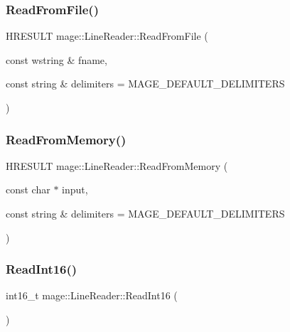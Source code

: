\subsubsection{\texorpdfstring{Read\+From\+File()}{ReadFromFile()}}
{\footnotesize\ttfamily H\+R\+E\+S\+U\+LT mage\+::\+Line\+Reader\+::\+Read\+From\+File (\begin{DoxyParamCaption}\item[{const wstring \&}]{fname,  }\item[{const string \&}]{delimiters = {\ttfamily MAGE\+\_\+DEFAULT\+\_\+DELIMITERS} }\end{DoxyParamCaption})}

\hypertarget{classmage_1_1_line_reader_a340d9f9a0d148b3a4dbe7ba300cfaca4}{}\label{classmage_1_1_line_reader_a340d9f9a0d148b3a4dbe7ba300cfaca4} 
\subsubsection{\texorpdfstring{Read\+From\+Memory()}{ReadFromMemory()}}
{\footnotesize\ttfamily H\+R\+E\+S\+U\+LT mage\+::\+Line\+Reader\+::\+Read\+From\+Memory (\begin{DoxyParamCaption}\item[{const char $\ast$}]{input,  }\item[{const string \&}]{delimiters = {\ttfamily MAGE\+\_\+DEFAULT\+\_\+DELIMITERS} }\end{DoxyParamCaption})}

\hypertarget{classmage_1_1_line_reader_a5ec3ccfcd1044f6be73c51082d2b57e3}{}\label{classmage_1_1_line_reader_a5ec3ccfcd1044f6be73c51082d2b57e3} 
\subsubsection{\texorpdfstring{Read\+Int16()}{ReadInt16()}}
{\footnotesize\ttfamily int16\+\_\+t mage\+::\+Line\+Reader\+::\+Read\+Int16 (\begin{DoxyParamCaption}{ }\end{DoxyParamCaption})\hspace{0.3cm}{\ttfamily [protected]}}

\hypertarget{classmage_1_1_line_reader_a45c66ad0b4676ef3fb2b5b08f04b509d}{}\label{classmage_1_1_line_reader_a45c66ad0b4676ef3fb2b5b08f04b509d} 
